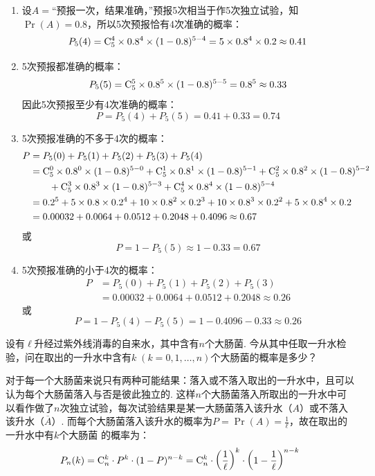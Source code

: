 \begin{solution}
\begin{enumerate}[(1)]
    \item 设$A=$“预报一次，结果准确，”预报5次相当于作5次独立试验，知$\Pr(A)=0.8$，所以5次预报恰有4次准确的概率：
\[P_5(4)={\rm C}^{4}_{5}\times0.8^4\times(1-0.8)^{5-4}=5\times0.8^4\times0.2\approx 0.41\]
\item 5次预报都准确的概率：
\[P_5(5)={\rm C}^{5}_{5}\times0.8^5\times(1-0.8)^{5-5}=0.8^5\approx 0.33\]
因此5次预报至少有4次准确的概率：
\[P=P_5(4)+P_5(5)=0.41+0.33=0.74\]
\item 5次预报准确的不多于4次的概率：
\[\begin{split}
    P&=P_{5}(0)+P_{5}(1)+P_{5}(2)+P_{5}(3)+P_{5}(4)\\
&={\rm C}_{5}^{0}\times 0.8^{0}\times(1-0.8)^{5-0}+{\rm C}_{5}^{1}\times0.8^{1}\times(1-0.8)^{5-1}+{\rm C}_{5}^{2}\times0.8^{2}\times(1-0.8)^{5-2}\\
&\qquad +{\rm C}_{5}^{3}\times0.8^{3}\times(1-0.8)^{5-3}+{\rm C}_{5}^{4}\times 0.8^{4}\times (1-0.8)^{5- 4}\\
&=0.2^{5}+5\times0.8\times0.2^{4}+10\times0.8^{2}\times0.2^{3}+10\times0.8^{3}\times0.2^{2}+5\times0.8^{4}\times0.2\\
&=0.00032+0.0064+0.0512+0.2048+0.4096\approx0.67
\end{split} \]
或
\[P=1-P_{5}(5)\approx 1-0.33=0.67\]

\item 5次预报准确的小于4次的概率：
\[\begin{split}
    P&=P_{5}(0)+P_{5}(1)+P_{5}(2)+P_{5}(3)\\
    &=0.00032+0.0064+0.0512+0.2048\approx 0.26
\end{split}\]
或
\[P=1-P_{5}(4)-P_{5}(5)=1-0.4096-0.33\approx 0.26\]
\end{enumerate}
\end{solution}

\begin{example}
    设有$\ell$升经过紫外线消毒的自来水，其中含有$n$个大肠菌. 今从其中任取一升水检验，问在取出的一升水中含有$k\; (k=0,1,\ldots,n)$个大肠菌的概率是多少？
\end{example}

\begin{solution}
  对于每一个大肠菌来说只有两种可能结果：落入或不落入取出的一升水中，且可以认为每个大肠菌落入与否是彼此独立的. 这样$n$个大肠菌落入所取出的一升水中可以看作做了$n$次独立试验，每次试验结果是某一大肠菌落入该升水（$A$）或不落入该升水（$\overline{A}$）. 而每个大肠菌落入该升水的概率为$P=\Pr(A)=\frac{1}{\ell}$，故在取出的一升水中有$k$个大肠菌
的概率为：
\[P_n(k)={\rm C}^{k}_{n}\cdot P^k\cdot (1-P)^{n-k}={\rm C}^{k}_{n}\cdot \left(\dfrac{1}{\ell}\right)^k\cdot \left(1-\dfrac{1}{\ell}\right)^{n-k}  \]
\end{solution}



